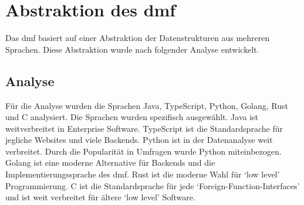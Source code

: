 \documentclass[./einleitung.tex]{subfiles}
\begin{document}
    \section{Abstraktion des \acrshort{dmf}}
    Das \acrshort{dmf} basiert auf einer Abstraktion der Datenstrukturen aus mehreren Sprachen.
    Diese Abstraktion wurde nach folgender Analyse entwickelt.

    \subsection{Analyse}
    Für die Analyse wurden die Sprachen Java, TypeScript, Python, Golang, Rust und C analysiert.
    Die Sprachen wurden spezifisch ausgewählt.
    Java ist weitverbreitet in Enterprise Software.
    TypeScript ist die Standardsprache für jegliche Websites und viele Backends.
    Python ist in der Datenanalyse weit verbreitet.
    Durch die Popularität in Umfragen wurde Python miteinbezogen.
    Golang ist eine moderne Alternative für Backends und die Implementierungssprache des \acrshort{dmf}.
    Rust ist die moderne Wahl für `low level' Programmierung.
    C ist die Standardsprache für jede `Foreign-Function-Interfaces' und ist weit verbreitet für ältere `low level' Software.
\end{document}
